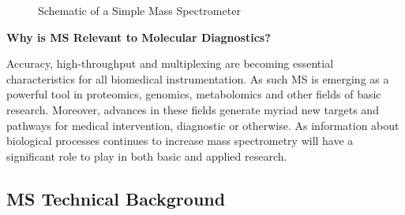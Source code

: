 \documentclass[letterpaper, 10 pt, conference]{ieeeconf}  %
\begin{document}
    \vspace{5 pt}

    \begin{figure}[h]
        \centering
    
        \caption{Schematic of a Simple Mass Spectrometer\autocite{R9}}

    \end{figure}

    \textbf{Why is MS Relevant to Molecular Diagnostics?}\hfill
    \vspace{5 pt}

    Accuracy, high-throughput and multiplexing are becoming essential characteristics for all biomedical instrumentation.\autocite{R7} As such MS is emerging as a powerful tool in proteomics, genomics, metabolomics and other fields of basic research. Moreover, advances in these fields generate myriad new targets and pathways for medical intervention, diagnostic or otherwise. As information about biological processes continues to increase mass spectrometry will have a significant role to play in both basic and applied research.

    \FloatBarrier

    \subsection[\textbf{MS Technical Background}]{\textbf{MS Technical Background}\autocite{R7}}
\end{document}
